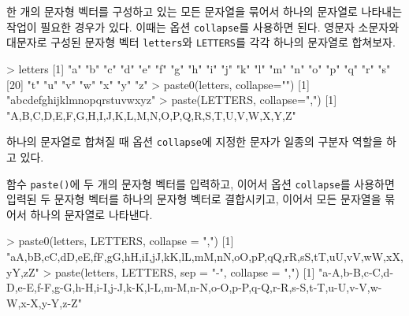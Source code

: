 \documentclass[
]{book}
\newenvironment{Shaded}{\begin{snugshade}}{\end{snugshade}}
\newcommand{\AttributeTok}[1]{\textcolor[rgb]{0.77,0.63,0.00}{#1}}
\newcommand{\DecValTok}[1]{\textcolor[rgb]{0.00,0.00,0.81}{#1}}
\newcommand{\FunctionTok}[1]{\textcolor[rgb]{0.00,0.00,0.00}{#1}}
\newcommand{\NormalTok}[1]{#1}
\newcommand{\SpecialCharTok}[1]{\textcolor[rgb]{0.00,0.00,0.00}{#1}}
\newcommand{\StringTok}[1]{\textcolor[rgb]{0.31,0.60,0.02}{#1}}
\begin{document}
한 개의 문자형 벡터를 구성하고 있는 모든 문자열을 묶어서 하나의 문자열로 나타내는
작업이 필요한 경우가 있다. 이때는 옵션 \texttt{collapse}를 사용하면 된다. 영문자 소문자와 대문자로 구성된 문자형 벡터 \texttt{letters}와 \texttt{LETTERS}를 각각 하나의 문자열로 합쳐보자.

\begin{Shaded}
\begin{Highlighting}[]
\SpecialCharTok{\textgreater{}}\NormalTok{ letters}
\NormalTok{ [}\DecValTok{1}\NormalTok{] }\StringTok{"a"} \StringTok{"b"} \StringTok{"c"} \StringTok{"d"} \StringTok{"e"} \StringTok{"f"} \StringTok{"g"} \StringTok{"h"} \StringTok{"i"} \StringTok{"j"} \StringTok{"k"} \StringTok{"l"} \StringTok{"m"} \StringTok{"n"} \StringTok{"o"} \StringTok{"p"} \StringTok{"q"} \StringTok{"r"} \StringTok{"s"}
\NormalTok{[}\DecValTok{20}\NormalTok{] }\StringTok{"t"} \StringTok{"u"} \StringTok{"v"} \StringTok{"w"} \StringTok{"x"} \StringTok{"y"} \StringTok{"z"}
\SpecialCharTok{\textgreater{}} \FunctionTok{paste0}\NormalTok{(letters, }\AttributeTok{collapse=}\StringTok{""}\NormalTok{)}
\NormalTok{[}\DecValTok{1}\NormalTok{] }\StringTok{"abcdefghijklmnopqrstuvwxyz"}
\SpecialCharTok{\textgreater{}} \FunctionTok{paste}\NormalTok{(LETTERS, }\AttributeTok{collapse=}\StringTok{","}\NormalTok{)}
\NormalTok{[}\DecValTok{1}\NormalTok{] }\StringTok{"A,B,C,D,E,F,G,H,I,J,K,L,M,N,O,P,Q,R,S,T,U,V,W,X,Y,Z"}
\end{Highlighting}
\end{Shaded}

하나의 문자열로 합쳐질 때 옵션 \texttt{collapse}에 지정한 문자가 일종의 구분자 역할을 하고
있다.

함수 \texttt{paste()}에 두 개의 문자형 벡터를 입력하고, 이어서 옵션 \texttt{collapse}를 사용하면 입력된 두 문자형 벡터를 하나의 문자형 벡터로 결합시키고, 이어서 모든 문자열을 묶어서 하나의 문자열로 나타낸다.

\begin{Shaded}
\begin{Highlighting}[]
\SpecialCharTok{\textgreater{}} \FunctionTok{paste0}\NormalTok{(letters, LETTERS, }\AttributeTok{collapse =} \StringTok{","}\NormalTok{)}
\NormalTok{[}\DecValTok{1}\NormalTok{] }\StringTok{"aA,bB,cC,dD,eE,fF,gG,hH,iI,jJ,kK,lL,mM,nN,oO,pP,qQ,rR,sS,tT,uU,vV,wW,xX,yY,zZ"}
\SpecialCharTok{\textgreater{}} \FunctionTok{paste}\NormalTok{(letters, LETTERS, }\AttributeTok{sep =} \StringTok{"{-}"}\NormalTok{, }\AttributeTok{collapse =} \StringTok{","}\NormalTok{)}
\NormalTok{[}\DecValTok{1}\NormalTok{] }\StringTok{"a{-}A,b{-}B,c{-}C,d{-}D,e{-}E,f{-}F,g{-}G,h{-}H,i{-}I,j{-}J,k{-}K,l{-}L,m{-}M,n{-}N,o{-}O,p{-}P,q{-}Q,r{-}R,s{-}S,t{-}T,u{-}U,v{-}V,w{-}W,x{-}X,y{-}Y,z{-}Z"}
\end{Highlighting}
\end{Shaded}
\end{document}
